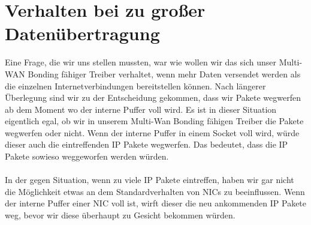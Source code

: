 \section{Verhalten bei zu großer Datenübertragung}
Eine Frage, die wir uns stellen mussten, war wie wollen wir das sich unser Multi-WAN Bonding fähiger Treiber verhaltet, wenn mehr Daten versendet werden als die einzelnen Internetverbindungen bereitstellen können. Nach längerer Überlegung sind wir zu der Entscheidung gekommen, dass wir Pakete wegwerfen ab dem Moment wo der interne Puffer voll wird. Es ist in dieser Situation eigentlich egal, ob wir in unserem Multi-Wan Bonding fähigen Treiber die Pakete wegwerfen oder nicht. Wenn der interne Puffer in einem Socket voll wird, würde dieser auch die eintreffenden IP Pakete wegwerfen. Das bedeutet, dass die IP Pakete sowieso weggeworfen werden würden.
\\\\
In der gegen Situation, wenn zu viele IP Pakete eintreffen, haben wir gar nicht die Möglichkeit etwas an dem Standardverhalten von NICs zu beeinflussen. Wenn der interne Puffer einer NIC voll ist, wirft dieser die neu ankommenden IP Pakete weg, bevor wir diese überhaupt zu Gesicht bekommen würden.